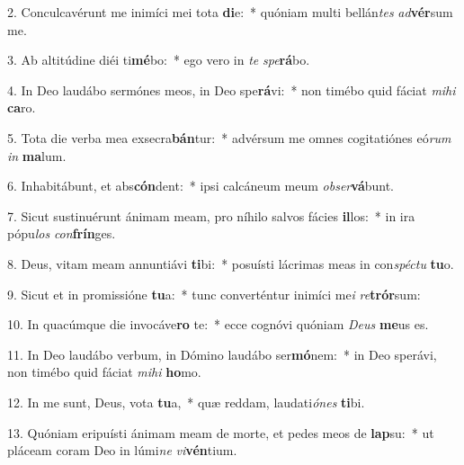 2. Conculcavérunt me inimíci mei tota \textbf{di}e:~*  quóniam multi bellán\textit{tes} \textit{ad}\textbf{vér}sum me.\

3. Ab altitúdine diéi ti\textbf{mé}bo:~*  ego vero in \textit{te} \textit{spe}\textbf{rá}bo.\

4. In Deo laudábo sermónes meos, in Deo spe\textbf{rá}vi:~*  non timébo quid fáciat \textit{mi}\textit{hi} \textbf{ca}ro.\

5. Tota die verba mea exsecra\textbf{bán}tur:~*  advérsum me omnes cogitatiónes eó\textit{rum} \textit{in} \textbf{ma}lum.\

6. Inhabitábunt, et abs\textbf{cón}dent:~*  ipsi calcáneum meum \textit{ob}\textit{ser}\textbf{vá}bunt.\

7. Sicut sustinuérunt ánimam meam, pro níhilo salvos fácies \textbf{il}los:~*  in ira pópu\textit{los} \textit{con}\textbf{frín}ges.\

8. Deus, vitam meam annuntiávi \textbf{ti}bi:~*  posuísti lácrimas meas in con\textit{spéc}\textit{tu} \textbf{tu}o.\

9. Sicut et in promissióne \textbf{tu}a:~*  tunc converténtur inimíci me\textit{i} \textit{re}\textbf{trór}sum:\

10. In quacúmque die invocáve\textbf{ro} te:~*  ecce cognóvi quóniam \textit{De}\textit{us} \textbf{me}us es.\

11. In Deo laudábo verbum, in Dómino laudábo ser\textbf{mó}nem:~*  in Deo sperávi, non timébo quid fáciat \textit{mi}\textit{hi} \textbf{ho}mo.\

12. In me sunt, Deus, vota \textbf{tu}a,~*  quæ reddam, laudati\textit{ó}\textit{nes} \textbf{ti}bi.\

13. Quóniam eripuísti ánimam meam de morte, et pedes meos de \textbf{lap}su:~*  ut pláceam coram Deo in lúmi\textit{ne} \textit{vi}\textbf{vén}tium.\

